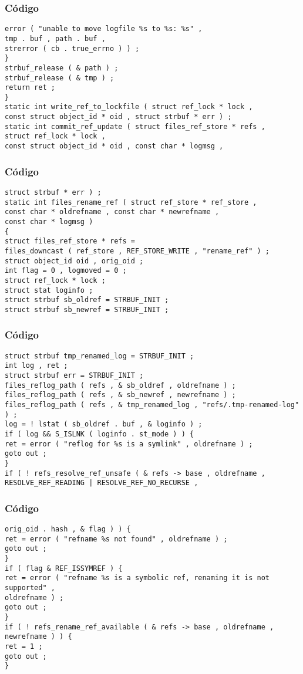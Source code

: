 \documentclass{beamer}
\begin{document}
\begin{frame}[fragile]
\frametitle{C\'odigo}
\begin{verbatim}
error ( "unable to move logfile %s to %s: %s" , 
tmp . buf , path . buf , 
strerror ( cb . true_errno ) ) ; 
} 
strbuf_release ( & path ) ; 
strbuf_release ( & tmp ) ; 
return ret ; 
} 
static int write_ref_to_lockfile ( struct ref_lock * lock , 
const struct object_id * oid , struct strbuf * err ) ; 
static int commit_ref_update ( struct files_ref_store * refs , 
struct ref_lock * lock , 
const struct object_id * oid , const char * logmsg , 
\end{verbatim}
\end{frame}
\begin{frame}[fragile]
\frametitle{C\'odigo}
\begin{verbatim}
struct strbuf * err ) ; 
static int files_rename_ref ( struct ref_store * ref_store , 
const char * oldrefname , const char * newrefname , 
const char * logmsg ) 
{ 
struct files_ref_store * refs = 
files_downcast ( ref_store , REF_STORE_WRITE , "rename_ref" ) ; 
struct object_id oid , orig_oid ; 
int flag = 0 , logmoved = 0 ; 
struct ref_lock * lock ; 
struct stat loginfo ; 
struct strbuf sb_oldref = STRBUF_INIT ; 
struct strbuf sb_newref = STRBUF_INIT ; 
\end{verbatim}
\end{frame}
\begin{frame}[fragile]
\frametitle{C\'odigo}
\begin{verbatim}
struct strbuf tmp_renamed_log = STRBUF_INIT ; 
int log , ret ; 
struct strbuf err = STRBUF_INIT ; 
files_reflog_path ( refs , & sb_oldref , oldrefname ) ; 
files_reflog_path ( refs , & sb_newref , newrefname ) ; 
files_reflog_path ( refs , & tmp_renamed_log , "refs/.tmp-renamed-log" ) ; 
log = ! lstat ( sb_oldref . buf , & loginfo ) ; 
if ( log && S_ISLNK ( loginfo . st_mode ) ) { 
ret = error ( "reflog for %s is a symlink" , oldrefname ) ; 
goto out ; 
} 
if ( ! refs_resolve_ref_unsafe ( & refs -> base , oldrefname , 
RESOLVE_REF_READING | RESOLVE_REF_NO_RECURSE , 
\end{verbatim}
\end{frame}
\begin{frame}[fragile]
\frametitle{C\'odigo}
\begin{verbatim}
orig_oid . hash , & flag ) ) { 
ret = error ( "refname %s not found" , oldrefname ) ; 
goto out ; 
} 
if ( flag & REF_ISSYMREF ) { 
ret = error ( "refname %s is a symbolic ref, renaming it is not supported" , 
oldrefname ) ; 
goto out ; 
} 
if ( ! refs_rename_ref_available ( & refs -> base , oldrefname , newrefname ) ) { 
ret = 1 ; 
goto out ; 
} 
\end{verbatim}
\end{frame}
\end{document}
